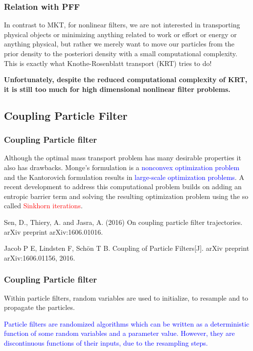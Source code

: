 \documentclass[table]{beamer}
\begin{document}
\begin{CJK}{UTF8}{gbsn}
\begin{frame}
\end{frame}

\begin{frame}
\frametitle{Relation with PFF}
 In contrast to MKT, for nonlinear
filters, we are not interested in transporting physical
objects or minimizing anything related to work or effort or
energy or anything physical, but rather we merely want to
move our particles from the prior density to the posteriori
density with a small computational complexity. This is
exactly what Knothe-Rosenblatt transport (KRT) tries to
do!

\hfill

\textbf{ Unfortunately, despite the reduced computational complexity of KRT, it
is still too much for high dimensional nonlinear filter
problems. }

\end{frame}

\subsection{Coupling Particle Filter}
\begin{frame}
\frametitle{Coupling Particle filter}
Although the optimal mass transport problem has many desirable properties it
also has drawbacks. Monge’s formulation is a \textcolor{blue}{nonconvex optimization problem} and
the Kantorovich formulation results in \textcolor{blue}{large-scale optimization problems}.
A recent development to address this computational problem builds on adding
an entropic barrier term and solving the resulting optimization problem using the
so called \textcolor{red}{Sinkhorn iterations}.
\begin{thebibliography}{1}
\beamertemplatearticlebibitems
{} Sen, D., Thiery, A. and Jasra, A. (2016) On coupling particle filter trajectories. arXiv preprint
arXiv:1606.01016.

 Jacob P E, Lindsten F, Schön T B. Coupling of Particle Filters[J]. arXiv preprint arXiv:1606.01156, 2016.
\end{thebibliography}
\end{frame}
\begin{frame}
\frametitle{Coupling Particle filter}
Within particle filters, random variables are used to initialize, to resample and to propagate the
particles. \\

\hfill

\textcolor{blue}{Particle filters are randomized algorithms which can be written as a deterministic function of some random variables and a parameter value. However, they are discontinuous functions of their inputs, due to the resampling steps.}



\end{frame}
\end{CJK}
\end{document}
